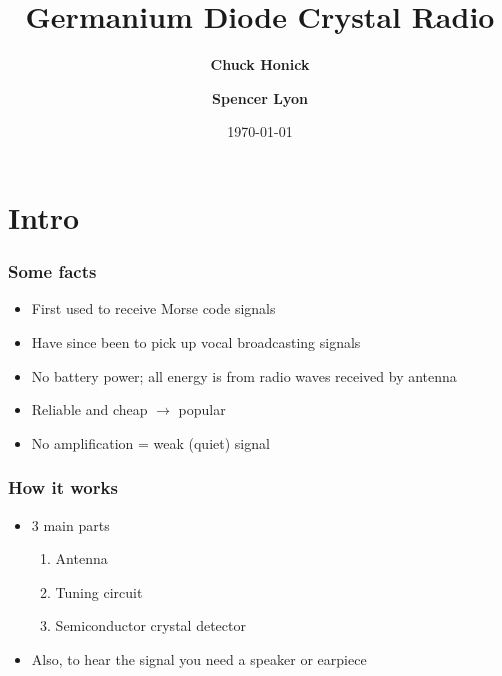 \documentclass[11pt]{beamer}
\title[Crystal Radio]{Germanium Diode Crystal Radio}
\author[Honick and Lyon]{\textbf{Chuck Honick} \and \textbf{Spencer Lyon}}
\date{\today}
\theoremstyle{definition}
\begin{document}
      \frame{\titlepage}

      \section{Intro}

         \begin{frame}
                  \frametitle{Some facts}
                  \begin{itemize}
                        \item First used to receive Morse code signals
                        \vspace{3mm}
                        \item Have since been to pick up vocal broadcasting signals
                        \vspace{3mm}
                        \item  No battery power; all energy is from radio waves received by antenna
                        \vspace{3mm}
                        \item Reliable and cheap $\rightarrow$ popular
                        \vspace{3mm}
                        \item No amplification = weak (quiet) signal
                  \end{itemize}
         \end{frame}


         \begin{frame}
                  \frametitle{How it works}
                  \begin{itemize}
                        \item 3 main parts
                        \vspace{2mm}
                        \begin{enumerate}
                           \item Antenna
                           \vspace{2mm}
                           \item Tuning circuit
                           \vspace{2mm}
                           \item Semiconductor crystal detector
                        \end{enumerate}
                        \vspace{2mm}
                        \item Also, to hear the signal you need a speaker or earpiece
                  \end{itemize}
         \end{frame}
\end{document}
